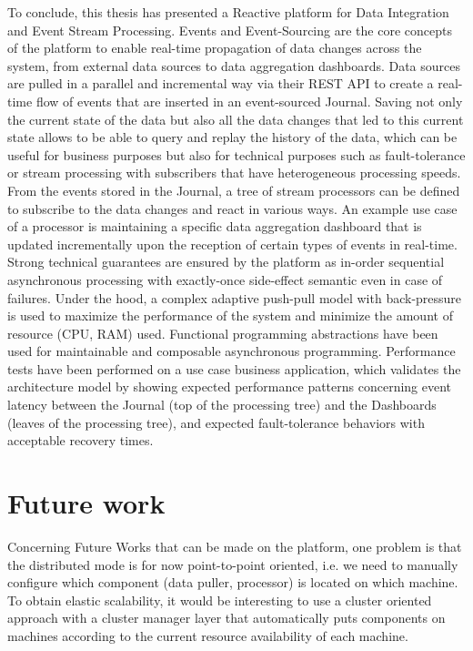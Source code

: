 To conclude, this thesis has presented a Reactive platform for Data Integration and Event Stream Processing. Events and Event-Sourcing are the core concepts of the platform to enable 
real-time propagation of data changes across the system, from external data sources to data aggregation dashboards. Data sources are pulled in a parallel and incremental way via their REST API to create a real-time flow of events that are inserted in an event-sourced Journal. Saving not only the current state of the data but also all the data changes
that led to this current state allows to be able to query and replay the history of the data, which can be useful for business purposes but also for technical purposes such as fault-tolerance or stream processing with subscribers that have heterogeneous processing speeds.
From the events stored in the Journal, a tree of stream processors can be defined to subscribe to the data changes and react in various ways. An example use case of a processor is maintaining a specific data aggregation dashboard that is updated incrementally upon the reception of certain types of events in real-time. Strong technical guarantees are ensured by the platform as in-order sequential asynchronous processing with exactly-once side-effect semantic even in case of failures. Under the hood, a complex adaptive push-pull model with back-pressure is used to maximize the performance of the system and minimize the amount of resource (CPU, RAM) used. Functional programming abstractions have been used for maintainable and composable asynchronous programming.
Performance tests have been performed on a use case business application, which validates the architecture model by showing expected performance patterns concerning event latency between the Journal (top of the processing tree) and the Dashboards (leaves of the processing tree), and expected fault-tolerance behaviors with acceptable recovery times.


\section{Future work}

Concerning Future Works that can be made on the platform, one problem is that the distributed mode is for now point-to-point oriented, i.e. we need to manually configure which component (data puller, processor) is located on which machine. To obtain elastic scalability, it would be interesting to use a cluster oriented approach with a cluster manager layer that automatically puts components on machines according to the current resource availability of each machine.
\\

